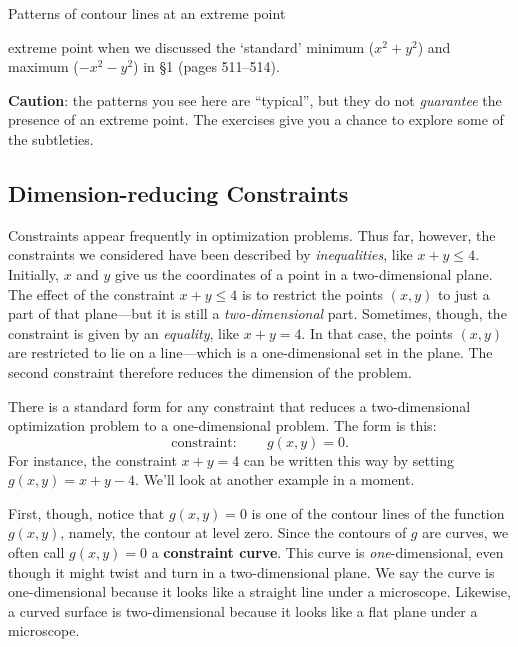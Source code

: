 {{{{\begin{center}
Patterns of contour lines at an extreme point
\end{center}

\vspace{-6pt}
\noindent
extreme point when we discussed the `standard' minimum ($x^2 + y^2$) and maximum ($-x^2 - y^2$) in \S 1 (pages 511--514).  

{\bf Caution}: the patterns you see here are ``typical'', but they do not {\em guarantee\/} the presence of an extreme point.  The exercises give you a chance to explore some of the subtleties.

\subsection{Dimension-reducing Constraints}

        Constraints appear frequently in optimization problems.  
Thus far, however, the constraints we considered have been described by {\em inequalities}, like $x + y \leq 4$.  Initially, $x$ and $y$ give us the coordinates of a point in a two-dimensional plane.   The effect of the constraint $x + y \leq 4$ is to restrict the points $(x, y)$ to just a part of that plane---but it is still a {\em two-dimensional\/} part.  Sometimes, though, the constraint is given by an {\em equality}, like $x + y = 4$.  In that case, the points $(x, y)$ are restricted to lie on a line---which is a one-dimensional set in the plane.  The second constraint therefore reduces the dimension of the problem. 

\vspace{18pt}

\newpage

        There is a standard form 
for any constraint that reduces a two-dimensional optimization problem to a one-dimensional problem.  The form is this:
        \[
\mbox{constraint}: \qquad g(x, y) = 0.
\] 
For instance, the constraint $x + y = 4$ can be written this way by setting $g(x, y) = x + y - 4$.   We'll look at another example in a moment.  

        First, though, notice that $g(x, y) = 0$ is one of the contour lines of the function $g(x, y)$, namely, the contour at level zero.  Since the contours of $g$ are curves, we often call $g(x, y) = 0$ a {\bf constraint curve}.  
This curve is {\em one\/}-dimensional, even though it might twist and turn in a two-dimensional plane.  We say the curve is one-dimensional because it looks like a straight line under a microscope.  Likewise, a curved surface is two-dimensional because it looks like a flat plane under a microscope.   

}}}}

